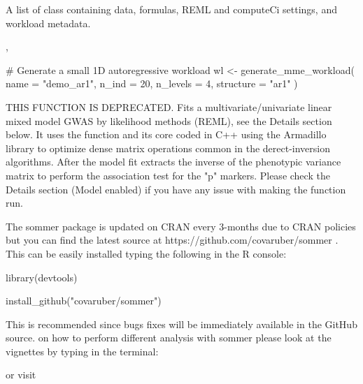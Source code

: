 \documentclass[a4paper]{book}
\begin{document}
%
\begin{Value}
A list of class  containing data, formulas, REML and
computeCi settings, and workload metadata.
\end{Value}
%
\begin{SeeAlso}\relax
{}, 
\end{SeeAlso}
%
\begin{Examples}
\begin{ExampleCode}
# Generate a small 1D autoregressive workload
wl <- generate_mme_workload(
  name = "demo_ar1",
  n_ind = 20,
  n_levels = 4,
  structure = "ar1"
)
\end{ExampleCode}
\end{Examples}
%
\begin{Description}\relax

THIS FUNCTION IS DEPRECATED. Fits a multivariate/univariate linear mixed model GWAS by likelihood methods (REML), see the Details section below. It uses the  function and its core coded in C++ using the Armadillo library to optimize dense matrix operations common in the derect-inversion algorithms. After the model fit extracts the inverse of the phenotypic variance matrix to perform the association test for the "p" markers. Please check the Details section (Model enabled) if you have any issue with making the function run.

The sommer package is updated on CRAN every 3-months due to CRAN policies but you can find the latest source at https://github.com/covaruber/sommer . This can be easily installed typing the following in the R console:

library(devtools)

install\_github("covaruber/sommer")

This is recommended since bugs fixes will be immediately available in the GitHub source.  on how to perform different analysis with sommer please look at the vignettes by typing in the terminal:





or visit 

\end{Description}
\end{document}
